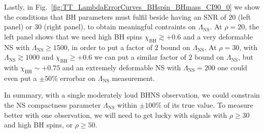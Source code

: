 \documentclass[aps,prd,amsmath,floats,floatfix, twocolumn,
superscriptaddress,nofootinbib,showpacs]{revtex4-1}
\newcommand{\lambdans}{\Lambda_\mathrm{NS}}
\newcommand{\chibh}{\chi_\mathrm{BH}}
\begin{document}
Lastly, in Fig.~\ref{fig:TT_LambdaErrorCurves_BHspin_BHmass_CI90_0} we show the
conditions that BH parameters must fulfil beside having an SNR of $20$ (left 
panel) or $30$ (right panel), to obtain meaningful contraints on $\lambdans$.
At $\rho=20$, the left panel shows that we need high BH spins 
$\chibh\gtrsim +0.6$ and a very deformable NS with $\lambdans\geq 1500$, in 
order to put a factor of $2$ bound on $\lambdans$. At $\rho=30$, with
$\lambdans\gtrsim 1000$ and $\chibh\geq+0.6$ we can put a similar factor of
$2$ bound on $\lambdans$, but with $\chibh\sim+0.75$ and an extremely deformable
NS with $\lambdans=200$ one could even put a $\pm 50\%$ errorbar on 
$\lambdans$ measurement.




In summary, with a single moderately loud BHNS observation, we could constrain
the NS compactness parameter $\lambdans$ within $\pm 100\%$ of its true value.
To measure better with one observation, we will need to get lucky with signals
with $\rho\geq 30$ and high BH spins, or $\rho\geq 50$.
\end{document}
